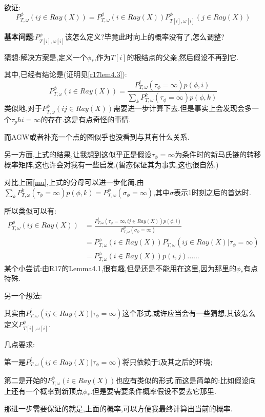 \documentclass[a4paper,oneside]{ctexbook}
\begin{document}
		\begin{pf}
			\label{fr}
			\ 

			欲证:
			$$P^{\phi}_{T,\omega}(ij\in Ray(X)) = P^{\phi}_{T,\omega}(i\in Ray(X))  P^{\phi}_{T[i],\omega[i]}(j\in Ray(X))$$

			\textbf{基本问题}:$P^{\phi}_{T[i],\omega[i]}$该怎么定义?毕竟此时向上的概率没有了,怎么调整?

			猜想:解决方案是,定义一个$\phi_*$,作为$T[i]$的根结点的父亲,然后假设不再到它.

			其中,已经有结论是(证明见\ref{r17lem4.3}):
			$$
			P^{\phi}_{T,\omega}(i\in Ray(X)) =  
			\frac
				{P^{i}_{T,\omega}(\tau_{\phi} = \infty)p(\phi,i)}
				{\sum_{k} P^{k}_{T,\omega}(\tau_{\phi} = \infty)p(\phi,k)}
			$$
			类似地,对于$P^{\phi}_{T,\omega}(ij \in Ray(X))$需要进一步计算下去.但是事实上会发现会多一个$\tau_phi = \infty$的存在.这是有点奇怪的事情.
			
			而AGW或者补充一个点的图似乎也没看到与其有什么关系.

			另一方面,上式的结果,让我想到这似乎正是假设$\tau_\phi = \infty$为条件时的新马氏链的转移概率矩阵,这也许会对我有一些启发.(暂态保证其为事实,这也很自然.)

			对比上面\ref{mu},上式的分母可以进一步化简,由$\sum_{k} P^{k}_{T,\omega}(\tau_{\phi} = \infty)p(\phi,k)=P^{\phi}_{T,\omega}(\sigma_{\phi}=\infty)$,其中$\sigma$表示1时刻之后的首达时.

			所以类似可以有:
			\begin{align*}
				P^{\phi}_{T,\omega}(ij\in Ray(X)) 
				&=
					\frac
					{P^{i}_{T,\omega}(\tau_{\phi} = \infty,ij\in Ray(X)) p(\phi,i)}
					{P^{\phi}_{T,\omega}(\sigma_{\phi}=\infty)} \\
				&=	P^{\phi}_{T,\omega}(i\in Ray(X))
					P^{i}_{T,\omega}(ij\in Ray(X) | \tau_{\phi} = \infty) \\
				&=	P^{\phi}_{T,\omega}(i\in Ray(X))
					p(i,j)......
			\end{align*}
			某个小尝试:由R17的Lemma4.1,很有趣,但是还是不能用在这里,因为那里的$\phi_*$有点特殊.
			
			另一个想法:

			其实由$P^{i}_{T,\omega}(ij\in Ray(X) | \tau_{\phi} = \infty)$这个形式,或许应当会有一些猜想,其该怎么定义$P^{\phi}_{T[i],\omega[i]}$.

			几点要求:

			第一是$P^{i}_{T,\omega}(ij\in Ray(X) | \tau_{\phi} = \infty)$将只依赖于i及其之后的环境;

			第二是开始的$P^{\phi}_{T,\omega}(i\in Ray(X))$也应有类似的形式.而这是简单的:比如假设向上还有一个概率到新顶点$\phi_*$.但是要需要条件概率假设不要去它那里.

			那进一步需要保证的就是,上面的概率,可以方便我最终计算出当前的概率.			
				


		\end{pf}
	
\end{document}
